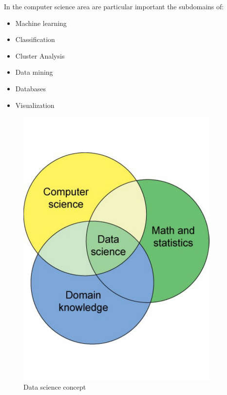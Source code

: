 \begin{minipage}{0.5\textwidth}
In the computer science area are particular important the subdomains of:
\begin{itemize}
\item Machine learning
\item Classification
\item Cluster Analysis
\item Data mining
\item Databases
\item Visualization
\end{itemize}
\end{minipage} \hfill
\begin{minipage}{0.50\textwidth}
\begin{figure}[H]
	\centering
    \includegraphics[trim={0 3cm 0 3cm},clip,width=0.9\textwidth]{Files/Data_Science_Concept.pdf}
    \caption{Data science concept}
    \label{fig: Data_science}
\end{figure}

\end{minipage}

